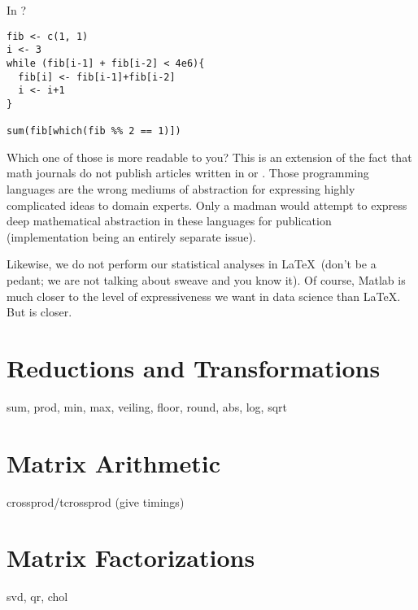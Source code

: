 In ?

\begin{lstlisting}[language=rr]
fib <- c(1, 1)
i <- 3
while (fib[i-1] + fib[i-2] < 4e6){
  fib[i] <- fib[i-1]+fib[i-2]
  i <- i+1
}
 
sum(fib[which(fib %% 2 == 1)])
\end{lstlisting}

Which one of those is more readable to you?  This is an extension of the fact that math journals do not publish articles written in  or .  Those programming languages are the wrong mediums of abstraction for expressing highly complicated ideas to domain experts.  Only a madman would attempt to express deep mathematical abstraction in these languages for publication (implementation being an entirely separate issue).  

Likewise, we do not perform our statistical analyses in \LaTeX\ (don't be a pedant; we are not talking about sweave and you know it).  Of course, Matlab is much closer to the level of expressiveness we want in data science than \LaTeX.  But  is closer.







\section{Reductions and Transformations}


sum, prod, min, max, veiling, floor, round, abs, log, sqrt





\section{Matrix Arithmetic}


crossprod/tcrossprod (give timings)







\section{Matrix Factorizations}

svd, qr, chol
